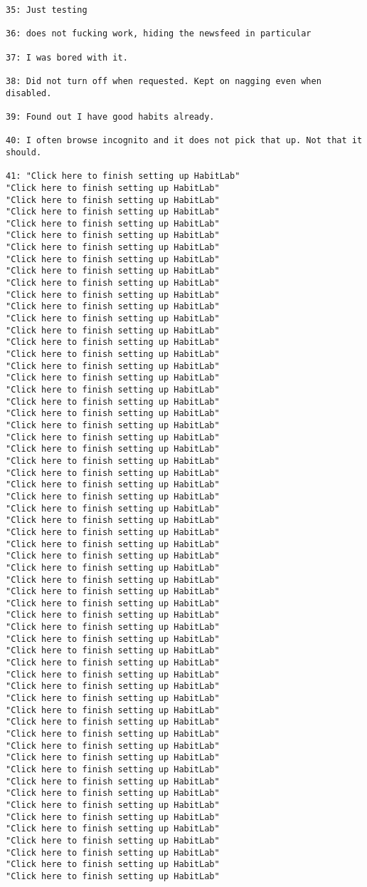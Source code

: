 \begin{lstlisting}[breaklines]
35: Just testing

36: does not fucking work, hiding the newsfeed in particular

37: I was bored with it.

38: Did not turn off when requested. Kept on nagging even when disabled.

39: Found out I have good habits already.

40: I often browse incognito and it does not pick that up. Not that it should.

41: "Click here to finish setting up HabitLab"
"Click here to finish setting up HabitLab"
"Click here to finish setting up HabitLab"
"Click here to finish setting up HabitLab"
"Click here to finish setting up HabitLab"
"Click here to finish setting up HabitLab"
"Click here to finish setting up HabitLab"
"Click here to finish setting up HabitLab"
"Click here to finish setting up HabitLab"
"Click here to finish setting up HabitLab"
"Click here to finish setting up HabitLab"
"Click here to finish setting up HabitLab"
"Click here to finish setting up HabitLab"
"Click here to finish setting up HabitLab"
"Click here to finish setting up HabitLab"
"Click here to finish setting up HabitLab"
"Click here to finish setting up HabitLab"
"Click here to finish setting up HabitLab"
"Click here to finish setting up HabitLab"
"Click here to finish setting up HabitLab"
"Click here to finish setting up HabitLab"
"Click here to finish setting up HabitLab"
"Click here to finish setting up HabitLab"
"Click here to finish setting up HabitLab"
"Click here to finish setting up HabitLab"
"Click here to finish setting up HabitLab"
"Click here to finish setting up HabitLab"
"Click here to finish setting up HabitLab"
"Click here to finish setting up HabitLab"
"Click here to finish setting up HabitLab"
"Click here to finish setting up HabitLab"
"Click here to finish setting up HabitLab"
"Click here to finish setting up HabitLab"
"Click here to finish setting up HabitLab"
"Click here to finish setting up HabitLab"
"Click here to finish setting up HabitLab"
"Click here to finish setting up HabitLab"
"Click here to finish setting up HabitLab"
"Click here to finish setting up HabitLab"
"Click here to finish setting up HabitLab"
"Click here to finish setting up HabitLab"
"Click here to finish setting up HabitLab"
"Click here to finish setting up HabitLab"
"Click here to finish setting up HabitLab"
"Click here to finish setting up HabitLab"
"Click here to finish setting up HabitLab"
"Click here to finish setting up HabitLab"
"Click here to finish setting up HabitLab"
"Click here to finish setting up HabitLab"
"Click here to finish setting up HabitLab"
"Click here to finish setting up HabitLab"
"Click here to finish setting up HabitLab"
"Click here to finish setting up HabitLab"
"Click here to finish setting up HabitLab"
"Click here to finish setting up HabitLab"
"Click here to finish setting up HabitLab"
"Click here to finish setting up HabitLab"
"Click here to finish setting up HabitLab"
"Click here to finish setting up HabitLab"
"Click here to finish setting up HabitLab"


\end{lstlisting}
